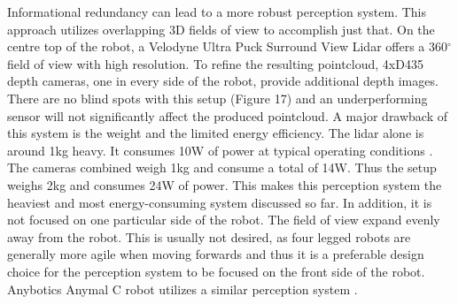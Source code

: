 \documentclass{article}
\begin{document}
\begin{enumerate}
Informational redundancy can lead to a more robust perception system. This approach utilizes overlapping 3D fields of view to accomplish just that. On the centre top of the robot, a Velodyne Ultra Puck Surround View Lidar offers a 360$^{\circ}$ field of view with high resolution. To refine the resulting pointcloud, 4xD435 depth cameras, one in every side of the robot, provide additional depth images. There are no blind spots with this setup (Figure 17) and an underperforming sensor will not significantly affect the produced pointcloud.
A major drawback of this system is the weight and the limited energy efficiency. The lidar alone is around 1kg heavy. It consumes 10W of power at typical operating conditions \cite{velodyne_ultra-puck_datasheet_nodate}. The cameras combined weigh 1kg and consume a total of 14W. Thus the setup weighs 2kg and consumes 24W of power. This makes this perception system the heaviest and most energy-consuming system discussed so far. In addition, it is not focused on one particular side of the robot. The field of view expand evenly away from the robot. This is usually not desired, as four legged robots are generally more agile when moving forwards and thus it is a preferable design choice for the perception system to be focused on the front side of the robot. Anybotics Anymal C robot utilizes a similar perception system \cite{noauthor_anymal_nodate}.


\end{enumerate}
\end{document}
